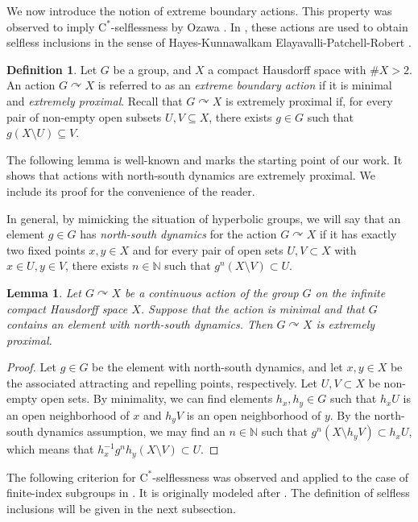 \documentclass[11pt]{article}
\newtheorem{lem}[thm]{Lemma}
\theoremstyle{definition}
\newtheorem{defn}[thm]{Definition}
\theoremstyle{remark}
\numberwithin{equation}{section}
\numberwithin{equation}{section}
\def\N{\mathbb{N}}
\newcommand{\Cs}{\ensuremath{\mathrm{C}^\ast}}
\numberwithin{equation}{section}
\begin{document}
We now introduce the notion of extreme boundary actions. This property was observed to imply \Cs-selflessness by Ozawa \cite[Section 8]{Oz25}. In \cite{FKOCP26}, these actions are used to obtain selfless inclusions in the sense of Hayes-Kunnawalkam Elayavalli-Patchell-Robert \cite{HKEPR25}.


\begin{defn}
Let $G$ be a group, and $X$ a compact Hausdorff space with $\# X>2$. An action $G\curvearrowright X$ is referred to as an \emph{extreme boundary action} if it is minimal and \emph{extremely proximal}. Recall that $G \curvearrowright X$ is extremely proximal if, for every pair of non-empty open subsets $U,V\subseteq X$, there exists $g\in G$ such that $g(X\setminus U)\subseteq V$.
\end{defn}

The following lemma is well-known and marks the starting point of our work. It shows that actions with north-south dynamics are extremely proximal. We include its proof for the convenience of the reader.

In general, by mimicking the situation of hyperbolic groups, we will say that an element $g\in G$ has \emph{north-south dynamics} for the action $G\curvearrowright X$ if it has exactly two fixed points $x,y\in X$ and for every pair of open sets $U,V\subset X$ with $x\in U,y\in V$, there exists $n\in\N$ such that $g^n(X\setminus V)\subset U$.

\begin{lem}\label{north-south}
    Let $G\curvearrowright X$ be a continuous action of the group $G$ on the infinite compact Hausdorff space $X$. Suppose that the action is minimal and that $G$ contains an element with north-south dynamics. Then $G\curvearrowright X$ is extremely proximal.
\end{lem}
\begin{proof}
    Let $g\in G$ be the element with north-south dynamics, and let $x,y\in X$ be the associated attracting and repelling points, respectively. Let $U,V\subset X$ be non-empty open sets. By minimality, we can find elements $h_x,h_y\in G$ such that $h_xU$ is an open neighborhood of $x$ and $h_yV$ is an open neighborhood of $y$. By the north-south dynamics assumption, we may find an $n\in \N$ such that $g^n(X\setminus h_yV)\subset h_xU$, which means that $h_x^{-1}g^nh_y(X\setminus V)\subset U$. \end{proof}

The following criterion for \Cs-selflessness was observed and applied to the case of finite-index subgroups in \cite{FKOCP26}. It is originally modeled after \cite[Proposition 15]{Oz25}. The definition of selfless inclusions will be given in the next subsection.
\end{document}
